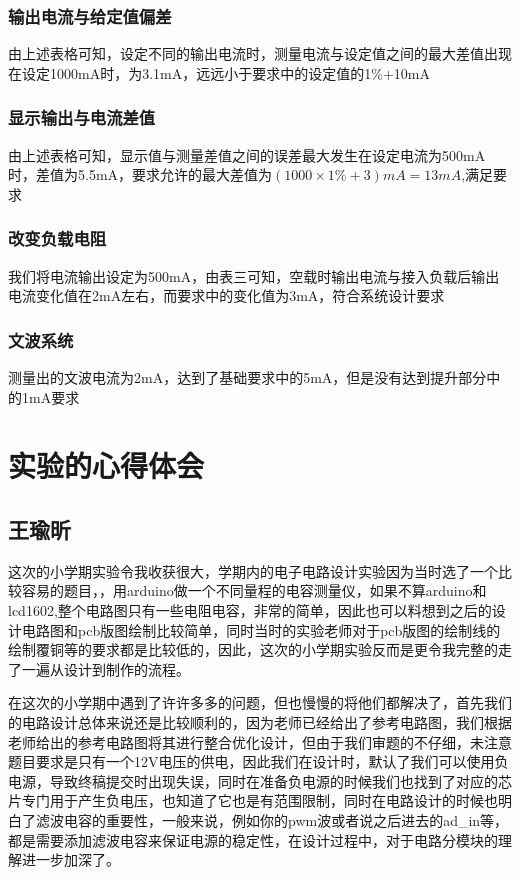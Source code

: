 \documentclass{zjureport}
\begin{document}
            \subsubsection{输出电流与给定值偏差}
            由上述表格可知，设定不同的输出电流时，测量电流与设定值之间的最大差值出现在设定1000mA时，为3.1mA，远远小于要求中的设定值的1\%+10mA
            \subsubsection{显示输出与电流差值}
            由上述表格可知，显示值与测量差值之间的误差最大发生在设定电流为500mA时，差值为5.5mA，要求允许的最大差值为$(1000\times 1\%+3)mA = 13mA$,满足要求
            \subsubsection{改变负载电阻}
            我们将电流输出设定为500mA，由表三可知，空载时输出电流与接入负载后输出电流变化值在2mA左右，而要求中的变化值为3mA，符合系统设计要求
            \subsubsection{文波系统}
            测量出的文波电流为2mA，达到了基础要求中的5mA，但是没有达到提升部分中的1mA要求

            \newpage
        
    \section{实验的心得体会}
        \subsection{王瑜昕}
        这次的小学期实验令我收获很大，学期内的电子电路设计实验因为当时选了一个比较容易的题目，，用arduino做一个不同量程的电容测量仪，如果不算arduino和lcd1602,整个电路图只有一些电阻电容，非常的简单，因此也可以料想到之后的设计电路图和pcb版图绘制比较简单，同时当时的实验老师对于pcb版图的绘制线的绘制覆铜等的要求都是比较低的，因此，这次的小学期实验反而是更令我完整的走了一遍从设计到制作的流程。

        在这次的小学期中遇到了许许多多的问题，但也慢慢的将他们都解决了，首先我们的电路设计总体来说还是比较顺利的，因为老师已经给出了参考电路图，我们根据老师给出的参考电路图将其进行整合优化设计，但由于我们审题的不仔细，未注意题目要求是只有一个12V电压的供电，因此我们在设计时，默认了我们可以使用负电源，导致终稿提交时出现失误，同时在准备负电源的时候我们也找到了对应的芯片专门用于产生负电压，也知道了它也是有范围限制，同时在电路设计的时候也明白了滤波电容的重要性，一般来说，例如你的pwm波或者说之后进去的ad_in等，都是需要添加滤波电容来保证电源的稳定性，在设计过程中，对于电路分模块的理解进一步加深了。
\end{document}
